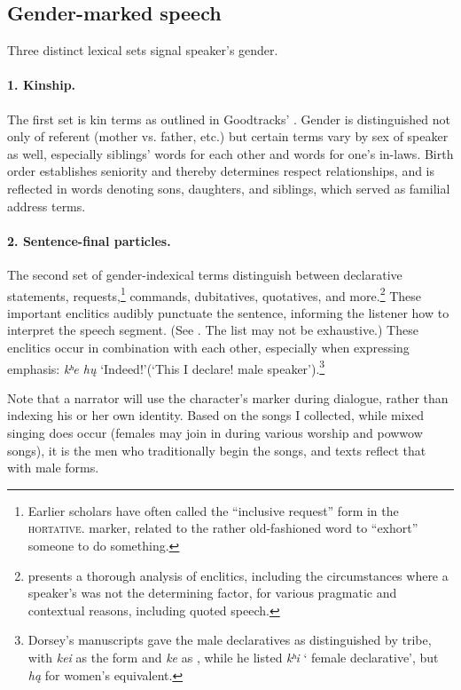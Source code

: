 \documentclass[output=paper]{LSP/langsci}
\begin{document}
\subsection{Gender-marked speech} Three distinct lexical sets signal speaker's {gender}.  

\paragraph*{1.  Kinship.}  The first set is kin terms as outlined in Goodtracks' . Gender is distinguished not only of referent (mother vs. father, etc.) but certain terms vary by sex of speaker as well, especially siblings' words for each other and words for one's in-laws.  Birth order establishes seniority and thereby determines respect relationships, and is reflected in words denoting sons, daughters, and siblings, which served as familial address terms.

\paragraph*{2. Sentence-final particles.} The second set of gender-indexical terms distinguish between declarative statements, requests,\footnote{Earlier scholars have often called the ``inclusive request'' form in  the \textsc{hortative.} marker, related to the rather old-fashioned word to ``exhort'' someone to do something.}  commands, dubitatives, quotatives, and more.\footnote{\citet{Trechter1995} presents a thorough analysis of  enclitics, including the circumstances where a speaker's  was not the determining factor, for various pragmatic and contextual reasons, including quoted speech.} These important enclitics audibly punctuate the sentence, informing the listener how to interpret the speech segment.   (See . The list may not be exhaustive.) These enclitics occur in combination with each other, especially when expressing emphasis: \textit{kʰe h\k{u}} `Indeed!'(`This I declare! male speaker').\footnote{Dorsey's manuscripts \citeyearpar{DorseyNDChiwere} gave the male declaratives as distinguished by tribe, with \textit{kei} as the  form and \textit{ke} as , while he listed \textit{kʰi} ` female declarative', but \textit{h\k{a}} for  women's equivalent.} 

Note that a narrator will use the character's  marker during dialogue, rather than indexing his or her own identity. Based on the songs I collected, while mixed  singing does occur (females may join in during various worship and powwow songs), it is the men who traditionally begin the songs, and texts reflect that with male forms.  
\end{document}
